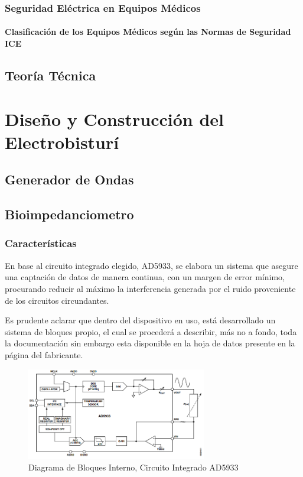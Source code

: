 \documentclass[12pt,letterpaper,spanish]{article}
\begin{document}
			\subsubsection{Seguridad Eléctrica en Equipos Médicos}	
				\paragraph{Clasificación de los Equipos Médicos según las Normas de Seguridad ICE}	
		
		\subsection{Teoría Técnica}
		
	\section{Diseño y Construcción del Electrobisturí}
		\subsection{Generador de Ondas}
		
		\subsection{Bioimpedanciometro}	
			\subsubsection{Características}
			En base al circuito integrado elegido, AD5933, se elabora un sistema que asegure una captación de datos de manera continua, con un margen de error mínimo, procurando reducir al máximo la interferencia generada por el ruido proveniente de los circuitos circundantes.
			
Es prudente aclarar que dentro del dispositivo en uso, está desarrollado un sistema de bloques propio, el cual se procederá a describir, más no a fondo, toda la documentación sin embargo esta disponible en la hoja de datos  presente en la página del fabricante.

			\begin{figure}[H]
				\centering
				\includegraphics[width=0.7\textwidth]{./Imagenes/D_Bloques_AD5933.png}
				\caption{Diagrama de Bloques Interno, Circuito Integrado AD5933}
			\end{figure}
			
\end{document}
